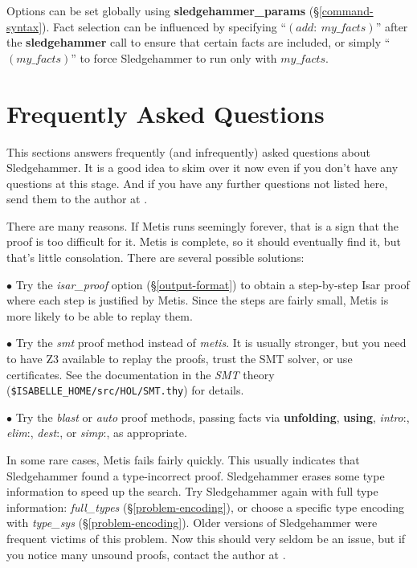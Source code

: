 \documentclass[a4paper,12pt]{article}
\begin{document}
Options can be set globally using \textbf{sledgehammer\_params}
(\S\ref{command-syntax}). Fact selection can be influenced by specifying
``$(\textit{add}{:}~\textit{my\_facts})$'' after the \textbf{sledgehammer}
call to ensure that certain facts are included, or simply
``$(\textit{my\_facts})$'' to force Sledgehammer to run only with
$\textit{my\_facts}$.

\section{Frequently Asked Questions}
\label{frequently-asked-questions}

This sections answers frequently (and infrequently) asked questions about
Sledgehammer. It is a good idea to skim over it now even if you don't have any
questions at this stage. And if you have any further questions not listed here,
send them to the author at \authoremail.


There are many reasons. If Metis runs seemingly forever, that is a sign that the
proof is too difficult for it. Metis is complete, so it should eventually find
it, but that's little consolation. There are several possible solutions:

\begin{enum}
\item[$\bullet$] Try the \textit{isar\_proof} option (\S\ref{output-format}) to
obtain a step-by-step Isar proof where each step is justified by Metis. Since
the steps are fairly small, Metis is more likely to be able to replay them.

\item[$\bullet$] Try the \textit{smt} proof method instead of \textit{metis}. It
is usually stronger, but you need to have Z3 available to replay the proofs,
trust the SMT solver, or use certificates. See the documentation in the
\emph{SMT} theory (\texttt{\$ISABELLE\_HOME/src/HOL/SMT.thy}) for details.

\item[$\bullet$] Try the \textit{blast} or \textit{auto} proof methods, passing
facts via \textbf{unfolding}, \textbf{using}, \textit{intro}{:},
\textit{elim}{:}, \textit{dest}{:}, or \textit{simp}{:}, as appropriate.
\end{enum}

In some rare cases, Metis fails fairly quickly. This usually indicates that
Sledgehammer found a type-incorrect proof. Sledgehammer erases some type
information to speed up the search. Try Sledgehammer again with full type
information: \textit{full\_types} (\S\ref{problem-encoding}), or choose a
specific type encoding with \textit{type\_sys} (\S\ref{problem-encoding}). Older
versions of Sledgehammer were frequent victims of this problem. Now this should
very seldom be an issue, but if you notice many unsound proofs, contact the
author at \authoremail.
\end{document}
